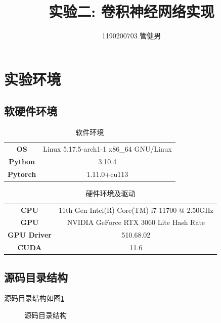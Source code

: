 \documentclass{article}
\title{实验二: 卷积神经网络实现}
\author{1190200703 管健男}
\date{}
\begin{document}
\maketitle


\section{实验环境}

\subsection{软硬件环境}

\begin{table}[h]
    \centering
    \begin{tabular}{|c|c|}
        \hline
        \textbf{OS}      & Linux 5.17.5-arch1-1 x86\_64 GNU/Linux \\
        \textbf{Python}  & 3.10.4                                 \\
        \textbf{Pytorch} & 1.11.0+cu113                           \\
        \hline
    \end{tabular}
    \caption{软件环境}
\end{table}

\begin{table}[h]
    \centering
    \begin{tabular}{|c|c|}
        \hline
        \textbf{CPU}        & 11th Gen Intel(R) Core(TM) i7-11700 @ 2.50GHz \\
        \textbf{GPU}        & NVIDIA GeForce RTX 3060 Lite Hash Rate        \\
        \textbf{GPU Driver} & 510.68.02                                     \\
        \textbf{CUDA}       & 11.6                                          \\
        \hline
    \end{tabular}
    \caption{硬件环境及驱动}
\end{table}

\subsection{源码目录结构}

源码目录结构如图\ref{src-dir}

\begin{figure}[H]
    \centering
    \begin{minipage}{0.5\linewidth}
    \end{minipage}
    \caption{源码目录结构}
    \label{src-dir}
\end{figure}
\end{document}
